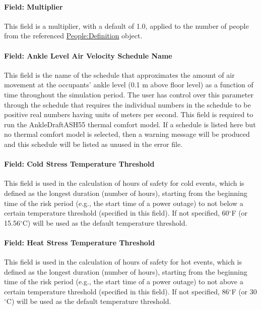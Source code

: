 \paragraph{Field: Multiplier}\label{field-multiplier-peopleinstance}

This field is a multiplier, with a default of 1.0, applied to the number of people from the referenced \hyperref[peopledefinition]{People:Definition} object.

\paragraph{Field: Ankle Level Air Velocity Schedule Name}\label{field-ankle-level-air-velocity-schedule-name-people-instance}

This field is the name of the schedule that approximates the amount of air movement at the occupants’ ankle level (0.1 m above floor level) as a function of time throughout the simulation period. The user has control over this parameter through the schedule that requires the individual numbers in the schedule to be positive real numbers having units of meters per second. This field is required to run the AnkleDraftASH55 thermal comfort model. If a schedule is listed here but no thermal comfort model is selected, then a warning message will be produced and this schedule will be listed as unused in the error file.

\paragraph{Field: Cold Stress Temperature Threshold}\label{cold-stress-temperature-threshold-people-instance}

This field is used in the calculation of hours of safety for cold events, which
is defined as the longest duration (number of hours), starting from the
beginning time of the risk period (e.g., the start time of a power outage) to
not below a certain temperature threshold (specified in this field). If not
specified, 60$^\circ$F (or 15.56$^\circ$C) will be used as the default temperature threshold.

\paragraph{Field: Heat Stress Temperature Threshold}\label{heat-stress-temperature-threshold-people-instance}

This field is used in the calculation of hours of safety for hot events, which
is defined as the longest duration (number of hours), starting from the
beginning time of the risk period (e.g., the start time of a power outage) to
not above a certain temperature threshold (specified in this field). If not
specified, 86$^\circ$F (or 30$^\circ$C) will be used as the default temperature threshold.

